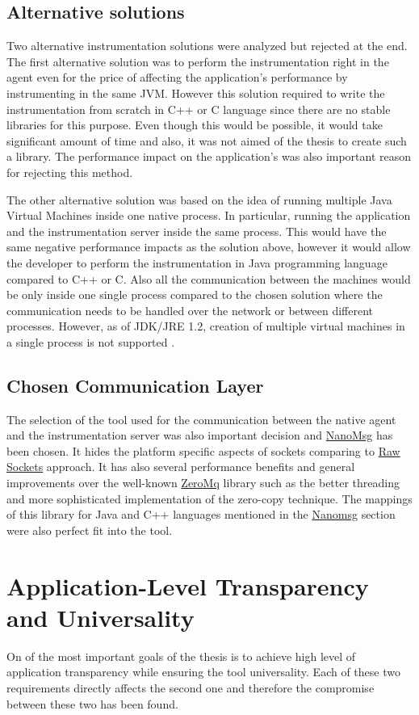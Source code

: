 \subsection{Alternative solutions}
Two alternative instrumentation solutions were analyzed but rejected at the end. The first alternative solution was to perform the instrumentation right in the agent even for the price of affecting the application's performance by instrumenting in the same JVM. However this solution required to write the instrumentation from scratch in C++ or C language since there are no stable libraries for this purpose. Even though this would be possible, it would take significant amount of time and also, it was not aimed of the thesis to create such a library. The performance impact on the application's was also important reason for rejecting this method.

The other alternative solution was based on the idea of running multiple Java Virtual Machines inside one native process. In particular, running the application and the instrumentation server inside the same process. This would have the same  negative performance impacts as the solution above, however it would allow the developer to perform the instrumentation in Java programming language compared to C++ or C. Also all the communication between the machines would be only inside one single process compared to the chosen solution where the communication needs to be handled over the network or between different processes. However, as of JDK/JRE 1.2, creation of multiple virtual machines in a single process is not supported \cite{MoreJVMOnceProccess}.
							
\subsection{Chosen Communication Layer}
The selection of the tool used for the communication between the native agent and the instrumentation server was also important decision and \hyperref[nanomsg]{NanoMsg} has been chosen. It hides the platform specific aspects of sockets comparing to \hyperref[raw_sockets]{Raw Sockets} approach. It has also several performance benefits and general improvements over the well-known \hyperref[zeromq]{ZeroMq} library such as the better threading and more sophisticated implementation of the zero-copy technique. The mappings of this library for Java and C++ languages mentioned in the \hyperref[nanomsg]{Nanomsg} section were also perfect fit into the tool.
		

\section{Application-Level \newline Transparency and Universality}
On of the most important goals of the thesis is to achieve high level of application transparency while ensuring the tool universality. Each of these two requirements directly affects the second one and therefore the compromise between these two has been found.


